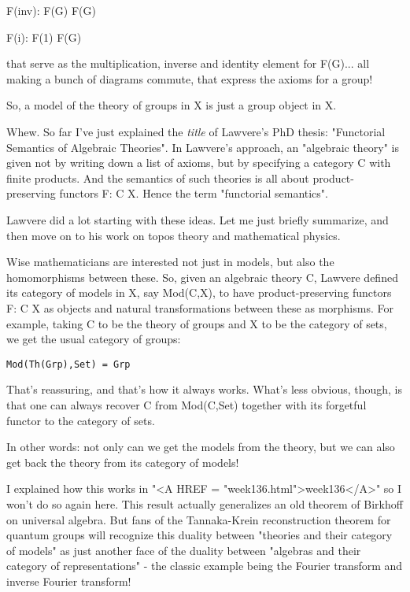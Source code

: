 F(inv): F(G) \to  F(G)

F(i): F(1) \to  F(G)
$$
    
that serve as the multiplication, inverse and identity element
for F(G)... all making a bunch of diagrams commute, that express
the axioms for a group!

So, a model of the theory of groups in X is just a group object in X.

Whew.  So far I've just explained the \emph{title} of Lawvere's PhD
thesis: "Functorial Semantics of Algebraic Theories".  In
Lawvere's approach, an "algebraic theory" is given not by
writing down a list of axioms, but by specifying a category C with
finite products.  And the semantics of such theories is all about
product-preserving functors F: C \to  X.  Hence the term
"functorial semantics".

Lawvere did a lot starting with these ideas.  Let me just briefly 
summarize, and then move on to his work on topos theory and mathematical 
physics.  

Wise mathematicians are interested not just in models, but also the 
homomorphisms between these.  So, given an algebraic theory C,
Lawvere defined its category of models in X, say Mod(C,X), to have 
product-preserving functors F: C \to  X as objects and natural 
transformations between these as morphisms.  For example, taking 
C to be the theory of groups and X to be the category of sets, we get 
the usual category of groups:

\begin{verbatim}
Mod(Th(Grp),Set) = Grp
\end{verbatim}
    
That's reassuring, and that's how it always works.  What's less obvious, 
though, is that one can always recover C from Mod(C,Set) together with 
its forgetful functor to the category of sets.  

In other words: not only can we get the models from the theory, but we 
can also get back the theory from its category of models!

I explained how this works in "<A HREF =
"week136.html">week136</A>" so I won't do so again here.  This
result actually generalizes an old theorem of Birkhoff on universal
algebra.  But fans of the Tannaka-Krein reconstruction theorem for
quantum groups will recognize this duality between "theories and
their category of models" as just another face of the duality
between "algebras and their category of representations" -
the classic example being the Fourier transform and inverse Fourier
transform!

